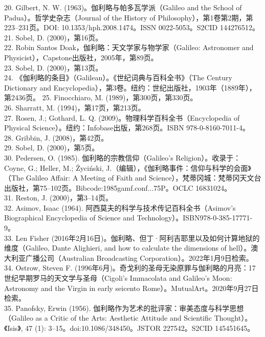 20. Gilbert, N. W. (1963)。伽利略与帕多瓦学派（Galileo and the School of Padua）。哲学史杂志（Journal of the History of Philosophy），第1卷第2期，第223–231页。DOI: 10.1353/hph.2008.1474。ISSN 0022-5053。S2CID 144276512。\\
21. Sobel, D. (2000)，第16页。\\
22. Robin Santos Doak，伽利略：天文学家与物学家（Galileo: Astronomer and Physicist），Capstone出版社，2005年，第89页。\\
23. Sobel, D. (2000)，第13页。\\
24. 《伽利略的条目》（Galilean）。《世纪词典与百科全书》（The Century Dictionary and Encyclopedia），第3卷。纽约：世纪出版社，1903年（1889年），第2436页。  
25. Finocchiaro, M. (1989)，第300页，第330页。\\
26. Sharratt, M. (1994)，第17页，第213页。\\
27. Rosen, J.; Gothard, L. Q. (2009)。物理科学百科全书（Encyclopedia of Physical Science）。纽约：Infobase出版，第268页。ISBN 978-0-8160-7011-4。\\
28. Gribbin, J. (2008)，第42页。\\
29. Sobel, D. (2000)，第5页。\\
30. Pedersen, O. (1985). 伽利略的宗教信仰（Galileo's Religion）。收录于：Coyne, G.; Heller, M.; Życiński, J.（编辑），《伽利略事件：信仰与科学的会面》（The Galileo Affair: A Meeting of Faith and Science），梵蒂冈城：梵蒂冈天文台出版社，第75–102页。Bibcode:1985gamf.conf...75P。OCLC 16831024。\\
31. Reston, J. (2000)，第3–14页。\\
32. Asimov, Isaac (1964). 阿西莫夫的科学与技术传记百科全书（Asimov's Biographical Encyclopedia of Science and Technology）。ISBN978-0-385-17771-9。\\  
33. Len Fisher (2016年2月16日)。伽利略、但丁·阿利吉耶里以及如何计算地狱的维度（Galileo, Dante Alighieri, and how to calculate the dimensions of hell）。澳大利亚广播公司（Australian Broadcasting Corporation）。2022年1月9日检索。\\
34. Ostrow, Steven F. (1996年6月)。奇戈利的圣母无染原罪与伽利略的月亮：17世纪早期罗马的天文学与圣母（Cigoli's Immacolata and Galileo's Moon: Astronomy and the Virgin in early seicento Rome）。MutualArt。2020年9月27日检索。\\ 
35. Panofsky, Erwin (1956). 伽利略作为艺术的批评家：审美态度与科学思想（Galileo as a Critic of the Arts: Aesthetic Attitude and Scientific Thought）。《Isis》, 47 (1): 3–15。doi:10.1086/348450。JSTOR 227542。S2CID 145451645。\\
